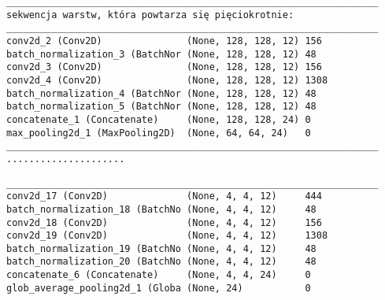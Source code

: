 \newsavebox\myvvv
\begin{lrbox}{\myvvv}
\setlength{\myminipagewidth}{0.9\linewidth} %
\setlength{\myminipagecentering}{(\linewidth-\myminipagewidth)/2}
\noindent\hspace{\myminipagecentering}\begin{minipage}{\myminipagewidth}
\begin{verbatim}
__________________________________________________________________
sekwencja warstw, która powtarza się pięciokrotnie:
__________________________________________________________________
conv2d_2 (Conv2D)               (None, 128, 128, 12) 156       
batch_normalization_3 (BatchNor (None, 128, 128, 12) 48                   
conv2d_3 (Conv2D)               (None, 128, 128, 12) 156       
conv2d_4 (Conv2D)               (None, 128, 128, 12) 1308        
batch_normalization_4 (BatchNor (None, 128, 128, 12) 48                    
batch_normalization_5 (BatchNor (None, 128, 128, 12) 48                     
concatenate_1 (Concatenate)     (None, 128, 128, 24) 0       
max_pooling2d_1 (MaxPooling2D)  (None, 64, 64, 24)   0            
__________________________________________________________________
.....................

\end{verbatim} 
\end{minipage}\end{lrbox}
\resizebox{0.75\textwidth}{!}{\usebox\myvvv}

\newsavebox\myvvvv
\begin{lrbox}{\myvvvv}
\setlength{\myminipagewidth}{0.9\linewidth} %
\setlength{\myminipagecentering}{(\linewidth-\myminipagewidth)/2}
\noindent\hspace{\myminipagecentering}\begin{minipage}{\myminipagewidth}
\begin{verbatim}
__________________________________________________________________
conv2d_17 (Conv2D)              (None, 4, 4, 12)     444         
batch_normalization_18 (BatchNo (None, 4, 4, 12)     48             
conv2d_18 (Conv2D)              (None, 4, 4, 12)     156     
conv2d_19 (Conv2D)              (None, 4, 4, 12)     1308   
batch_normalization_19 (BatchNo (None, 4, 4, 12)     48                
batch_normalization_20 (BatchNo (None, 4, 4, 12)     48                 
concatenate_6 (Concatenate)     (None, 4, 4, 24)     0       
glob_average_pooling2d_1 (Globa (None, 24)           0             
\end{verbatim} 
\end{minipage}\end{lrbox}
\resizebox{0.75\textwidth}{!}{\usebox\myvvvv}

